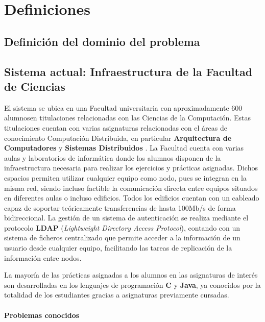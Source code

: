 \section{Definiciones}

\subsection{Definición del dominio del problema}


\subsection{Sistema actual: Infraestructura de la Facultad de Ciencias}
\label{dominioproblema:infraestructura}
El sistema se ubica en una Facultad universitaria con aproximadamente 600 alumnos en titulaciones relacionadas con las Ciencias de la Computación. Estas titulaciones cuentan con varias asignaturas relacionadas con el áreas de conocimiento Computación Distribuida, en particular \textbf{Arquitectura de Computadores} y \textbf{Sistemas Distribuidos} \cite{DIA15GuiaAcademica}. La Facultad cuenta con varias aulas y laboratorios de informática donde los alumnos disponen de la infraestructura necesaria para realizar los ejercicios y prácticas asignadas. Dichos espacios permiten utilizar cualquier equipo como nodo, pues se integran en la misma red, siendo incluso factible la comunicación directa entre equipos situados en diferentes aulas o incluso edificios. Todos los edificios cuentan con un cableado capaz de soportar teóricamente transferencias de hasta 100Mb/s de forma bidireccional\citationneeded. La gestión de un sistema de autenticación se realiza mediante el protocolo \textbf{LDAP} (\textit{Lightweight Directory Access Protocol})\cite{RFC4516-comment}, contando con un sistema de ficheros centralizado que permite acceder a la información de un usuario desde cualquier equipo, facilitando las tareas de replicación de la información entre nodos.

La mayoría de las prácticas asignadas a los alumnos en las asignaturas de interés son desarrolladas en los lenguajes de programación \textbf{C} y \textbf{Java}, ya conocidos por la totalidad de los estudiantes gracias a asignaturas previamente cursadas.

\paragraph{Problemas conocidos}

